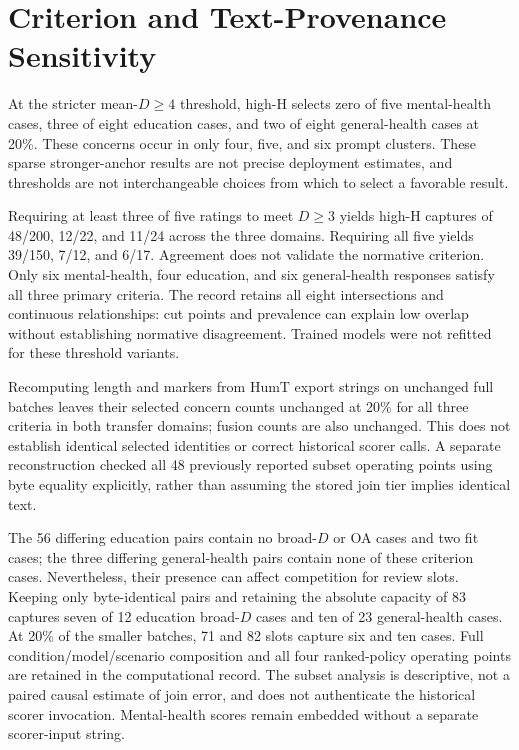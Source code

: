 \documentclass[manuscript,screen,review,anonymous]{acmart}
\begin{document}
\section{Criterion and Text-Provenance Sensitivity}\label{app:sensitivity}
At the stricter mean-$D\geq4$ threshold, high-H selects zero of five mental-health cases, three of eight education cases, and two of eight general-health cases at 20\%. These concerns occur in only four, five, and six prompt clusters. These sparse stronger-anchor results are not precise deployment estimates, and thresholds are not interchangeable choices from which to select a favorable result.

Requiring at least three of five ratings to meet $D\geq3$ yields high-H captures of 48/200, 12/22, and 11/24 across the three domains. Requiring all five yields 39/150, 7/12, and 6/17. Agreement does not validate the normative criterion. Only six mental-health, four education, and six general-health responses satisfy all three primary criteria. The record retains all eight intersections and continuous relationships: cut points and prevalence can explain low overlap without establishing normative disagreement. Trained models were not refitted for these threshold variants.

Recomputing length and markers from HumT export strings on unchanged full batches leaves their selected concern counts unchanged at 20\% for all three criteria in both transfer domains; fusion counts are also unchanged. This does not establish identical selected identities or correct historical scorer calls. A separate reconstruction checked all 48 previously reported subset operating points using byte equality explicitly, rather than assuming the stored join tier implies identical text.




The 56 differing education pairs contain no broad-$D$ or OA cases and two fit cases; the three differing general-health pairs contain none of these criterion cases. Nevertheless, their presence can affect competition for review slots. Keeping only byte-identical pairs and retaining the absolute capacity of 83 captures seven of 12 education broad-$D$ cases and ten of 23 general-health cases. At 20\% of the smaller batches, 71 and 82 slots capture six and ten cases. Full condition/model/scenario composition and all four ranked-policy operating points are retained in the computational record. The subset analysis is descriptive, not a paired causal estimate of join error, and does not authenticate the historical scorer invocation. Mental-health scores remain embedded without a separate scorer-input string.
\end{document}
